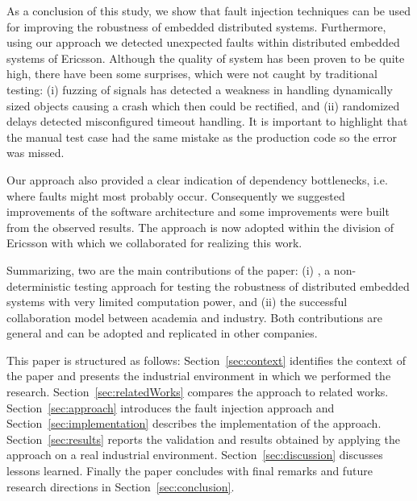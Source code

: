 As a conclusion of this study, we show that fault injection techniques can be used for improving the robustness of embedded distributed
systems. Furthermore, using our approach we detected unexpected faults within distributed embedded systems of Ericsson. 
Although the quality of system has been proven to be quite high, there have been some surprises, which were not caught by traditional testing: (i) fuzzing of signals has detected a weakness in handling dynamically sized objects causing a crash which then could be rectified, and (ii) randomized delays detected misconfigured timeout handling. It is important to highlight that the manual test case had the same mistake as the production code so the error was missed.

Our approach also provided a clear indication of dependency bottlenecks, i.e. where faults might most probably occur. Consequently we suggested improvements of the software architecture and some %
improvements
were built from the observed results. The approach is now adopted within the division of Ericsson with which we collaborated for realizing this work.
 
Summarizing, two are the main contributions of the paper: (i) \approach{}, a non-deterministic testing approach for testing the robustness of distributed embedded systems 
with very limited computation power, and (ii)
the successful collaboration model between academia and industry. Both contributions are general and can be adopted and replicated in other companies.

This paper is structured as follows: Section~\ref{sec:context} identifies the context of the paper and presents the industrial environment in which we performed the research. Section~\ref{sec:relatedWorks} compares the approach to related works. Section~\ref{sec:approach} introduces the fault injection approach and Section~\ref{sec:implementation} describes the implementation of the approach. Section~\ref{sec:results} reports the validation and results obtained by applying the approach on a real industrial environment. Section~\ref{sec:discussion} discusses lessons learned. Finally the paper concludes with final remarks and future research directions in Section~\ref{sec:conclusion}.

